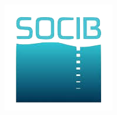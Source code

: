 \begin{titlepage}
\begin{center}
\hspace{+0.6cm}\includegraphics[scale=0.25]{fig/socib.png}\\
\end{center}
\end{titlepage}


